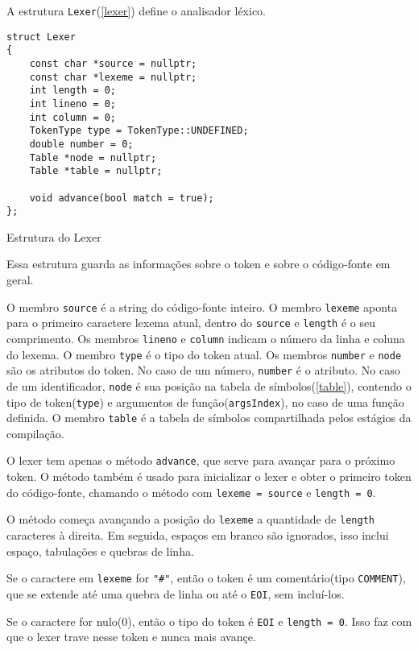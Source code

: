 \documentclass[10pt,a4paper]{article}
\newenvironment{code}{\captionsetup{type=listing}}{}
\begin{document}
A estrutura \texttt{Lexer}(\ref{lexer}) define o analisador léxico.
\begin{code}
\begin{verbatim}
struct Lexer
{
    const char *source = nullptr;
    const char *lexeme = nullptr;
    int length = 0;
    int lineno = 0;
    int column = 0;
    TokenType type = TokenType::UNDEFINED;
    double number = 0;
    Table *node = nullptr;
    Table *table = nullptr;

    void advance(bool match = true);
};
\end{verbatim}
\caption{Estrutura do Lexer}
\label{lexer}
\end{code}

Essa estrutura guarda as informações sobre o token e sobre o código-fonte em geral.

O membro \texttt{source} é a string do código-fonte inteiro.
O membro \texttt{lexeme} aponta para o primeiro caractere lexema atual,
dentro do \texttt{source} e \texttt{length} é o seu comprimento.
Os membros \texttt{lineno} e \texttt{column} indicam o número da linha e coluna do lexema.
O membro \texttt{type} é o tipo do token atual.
Os membros \texttt{number} e \texttt{node} são os atributos do token.
No caso de um número, \texttt{number} é o atributo.
No caso de um identificador, \texttt{node} é sua posição na tabela de símbolos(\ref{table}), 
contendo o tipo de token(\texttt{type}) e argumentos de função(\texttt{argsIndex}), no caso de uma função definida.
O membro \texttt{table} é a tabela de símbolos compartilhada pelos estágios da compilação.

O lexer tem apenas o método \texttt{advance}, que serve para avançar para o próximo token.
O método também é usado para inicializar o lexer e obter o primeiro token do código-fonte,
chamando o método com \texttt{lexeme = source} e \texttt{length = 0}.

O método começa avançando a posição do \texttt{lexeme} a quantidade de \texttt{length} caracteres à direita.
Em seguida, espaços em branco são ignorados, isso inclui espaço, tabulações e quebras de linha.

Se o caractere em \texttt{lexeme} for \texttt{"\#"}, então o token é um comentário(tipo \texttt{COMMENT}),
que se extende até uma quebra de linha ou até o \texttt{EOI}, sem incluí-los.

Se o caractere for nulo(0), então o tipo do token é \texttt{EOI} e \texttt{length = 0}.
Isso faz com que o lexer trave nesse token e nunca mais avançe.
\end{document}
